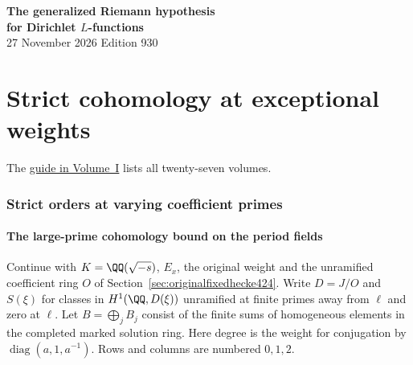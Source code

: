 \documentclass[a4paper,11pt]{article}
\theoremstyle{definition}
\theoremstyle{remark}
\numberwithin{equation}{section}
\begin{document}
\setcounter{part}{10}
\thispagestyle{plain}\begin{center}
{\LARGE\bfseries The generalized Riemann hypothesis\\[2pt]for Dirichlet \(L\)-functions}\\[6pt]
{\small 27 November 2026 \quad\textperiodcentered\quad Edition 930}\end{center}
\part{Strict cohomology at exceptional weights}\label{part:XI}
\begin{abstract}\noindent We identify the twists at which two ordinary characters coincide. Bounds on conductors and the spacing of weights reduce the surviving cases to unit, regulator and class group calculations in the real cyclotomic tower and its quadratic extensions.\end{abstract}
\setcounter{section}{53}
\noindent The \hyperref[seriesguide]{guide in Volume~I} lists all twenty-seven volumes.
\begingroup\small\setlength{\parskip}{0pt}\tableofcontents\endgroup
\clearpage

\section{Strict orders at varying coefficient primes}\label{nav:chapter-varying-coefficients}\label{nav:volume-XI}
\subsection{The large-prime cohomology bound on the period fields}
\label{sec:periodfieldlarge425}

Continue with \(K=\QQ(\sqrt{-s})\), \(E_x\), the original
weight and the unramified coefficient ring \(O\) of
Section~\ref{sec:originalfixedhecke424}. Write \(D=J/O\) and
\(S(\xi)\) for classes in \(H^1(\QQ,D(\xi))\) unramified at
finite primes away from \(\ell\) and zero at \(\ell\). Let
\(B=\bigoplus_j B_j\) consist of the finite sums of homogeneous
elements in the completed marked solution ring. Here degree
is the weight for conjugation by
\(\operatorname{diag}(a,1,a^{-1})\). Rows and columns are
numbered \(0,1,2\).
\end{document}

